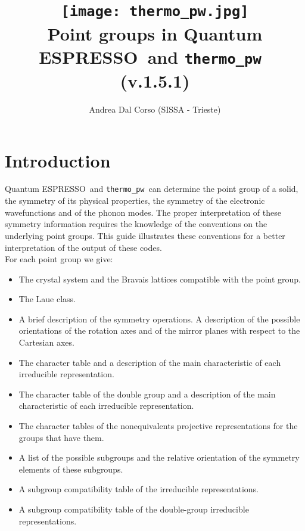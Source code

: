 \documentclass[12pt,a4paper]{article}
\def\version{1.5.1}
\def\qe{{\sc Quantum ESPRESSO}}
\def\thermo{\texttt{thermo\_pw}}
\begin{document}
 

\author{Andrea Dal Corso (SISSA - Trieste)}
\date{}

\title{
  \texttt{[image: thermo\_pw.jpg]} \\
  \vspace{3truecm}
  \Huge \color{blue} Point groups in \qe\ and \thermo\ \\
   (v.\version)
}

\maketitle

\newpage

\tableofcontents

\newpage
\newpage
\section{\color{coral}Introduction}
\qe\ and \thermo\ can determine the point group of a
solid, the symmetry of its physical properties, the symmetry
of the electronic wavefunctions and of the phonon modes. The proper interpretation
of these symmetry information requires the knowledge of the conventions on the 
underlying point groups. This guide illustrates these conventions
for a better interpretation of the output of these codes. \\
For each point group we give: 
\begin{itemize}

\item
The crystal system and the Bravais lattices compatible with the point
group.

\item
The Laue class.

\item
A brief description of the symmetry operations. 
A description of the possible orientations of the rotation axes and of the 
mirror planes with respect to the Cartesian axes.

\item
The character table and a description of the main characteristic of each 
irreducible representation.

\item
The character table of the double group and a description of the main 
characteristic of each irreducible representation.

\item
The character tables of the nonequivalents projective representations for the 
groups that have them.

\item
A list of the possible subgroups and the relative orientation of the symmetry
elements of these subgroups.

\item
A subgroup compatibility table of the irreducible representations.

\item
A subgroup compatibility table of the double-group irreducible representations. 

\end{itemize}
\end{document}
